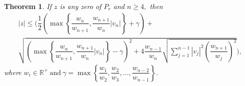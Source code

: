 \documentclass [12pt]{article}
\newtheorem{theorem}{Theorem}
[section]
\begin{document}
\begin{theorem}\label{th:03}
	If $z$ is any zero of $P_{r}$ and $n\ge 4,$ then
	\begin{multline*}
		|z|\le \biggl(\dfrac{1}{2}                                  \left( \max \left\{ \dfrac{w_{n}}{w_{n+1}},\dfrac{w_{n+1}}{w_{n}}|v_{n}|\right\}+\gamma\right)+\\\sqrt{   \left( \max \left\{ \dfrac{w_{n}}{w_{n+1}},\dfrac{w_{n+1}}{w_{n}}|v_{n}|\right\}-\gamma\right)^{2}    +4\dfrac{w_{n-1}}{w_{n}} \sqrt{\sum_{j=1}^{n-1}|v_{j}|^{2}\left(\dfrac{w_{n+1}}{w_{j}}\right)^{2}}} \biggr),
	\end{multline*}
	where $w_{i}\in\mathbb{R^{+}}~ \mbox{and}~ \gamma=\max\left\{\dfrac{w_{1}}{w_{2}} ,  \dfrac{w_{2}}{w_{3}},\dots,\dfrac{w_{n-2}}{w_{n-1}}           \right\}. $
\end{theorem}
\end{document}
